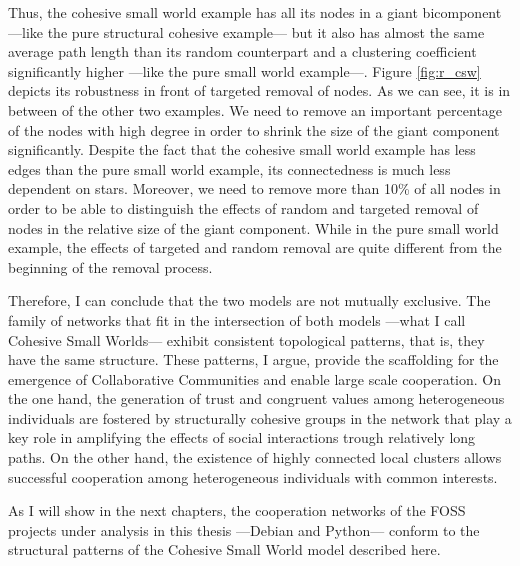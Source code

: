 Thus, the cohesive small world example has all its nodes in a giant bicomponent ---like the pure structural cohesive example--- but it also has almost the same average path length than its random counterpart and a clustering coefficient significantly higher ---like the pure small world example---. Figure \ref{fig:r_csw} depicts its robustness in front of targeted removal of nodes. As we can see, it is in between of the other two examples. We need to remove an important percentage of the nodes with high degree in order to shrink the size of the giant component significantly. Despite the fact that the cohesive small world example has less edges than the pure small world example, its connectedness is much less dependent on stars. Moreover, we need to remove more than 10\% of all nodes in order to be able to distinguish the effects of random and targeted removal of nodes in the relative size of the giant component. While in the pure small world example, the effects of targeted and random removal are quite different from the beginning of the removal process.

Therefore, I can conclude that the two models are not mutually exclusive. The family of networks that fit in the intersection of both models ---what I call Cohesive Small Worlds--- exhibit consistent topological patterns, that is, they have the same structure. These patterns, I argue, provide the scaffolding for the emergence of Collaborative Communities and enable large scale cooperation. On the one hand, the generation of trust and congruent values among heterogeneous individuals are fostered by structurally cohesive groups in the network that play a key role in amplifying the effects of social interactions trough relatively long paths. On the other hand, the existence of highly connected local clusters allows successful cooperation among heterogeneous individuals with common interests.

As I will show in the next chapters, the cooperation networks of the FOSS projects under analysis in this thesis ---Debian and Python--- conform to the structural patterns of the Cohesive Small World model described here.

